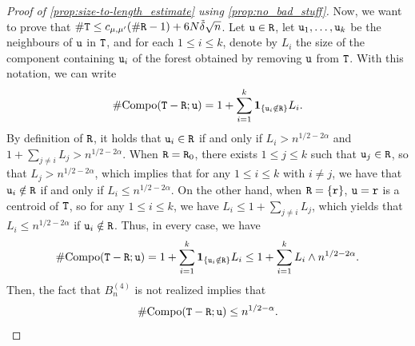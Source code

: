 \documentclass[11pt,reqno]{amsart}
\begin{document}
\begin{proof}[Proof of \cref{prop:size-to-length_estimate} using \cref{prop:no_bad_stuff}]
Now, we want to prove that $\#\mathtt{T}\leq c_{\mu,\mu'}(\#\mathtt{R}-1)+6N\tilde{\delta}\sqrt{n}$. Let $\mathtt{u}\in\mathtt{R}$, let $\mathtt{u}_1,\ldots,\mathtt{u}_k$ be the neighbours of $\mathtt{u}$ in $\mathtt{T}$, and for each $1\leq i\leq k$, denote by $L_i$ the size of the component containing $\mathtt{u}_i$ of the forest obtained by removing $\mathtt{u}$ from $\mathtt{T}$.
With this notation, we can write
\[\#\mathrm{Compo}(\mathtt{T}-\mathtt{R};\mathtt{u})=1+\sum_{i=1}^k {\mathbf 1}_{\left\{\mathtt{u}_i\notin\mathtt{R}\right\}} L_i.\]
By definition of $\mathtt{R}$, it holds that $\mathtt{u}_i\in\mathtt{R}$ if and only if $L_i>n^{1/2-2\alpha}$ and $1+\sum_{j\neq i}L_j>n^{1/2-2\alpha}$. When $\mathtt{R}=\mathtt{R}_0$, there exists $1\leq j\leq k$ such that $\mathtt{u}_j\in\mathtt{R}$, so that $L_j>n^{1/2-2\alpha}$, which implies that for any $1\leq i\leq k$ with $i\neq j$, we have that $\mathtt{u}_i\notin\mathtt{R}$ if and only if $L_i\leq n^{1/2-2\alpha}$. 
On the other hand, when $\mathtt{R}=\{\mathtt{r}\}$, $\mathtt{u}=\mathtt{r}$ is a centroid of $\mathtt{T}$, so for any $1\leq i\leq k$, we have $L_i\leq 1+\sum_{j\neq i}L_j$, which yields that $L_i\leq n^{1/2-2\alpha}$ if $\mathtt{u}_i\notin\mathtt{R}$. 
Thus, in every case, we have
\[\#\mathrm{Compo}(\mathtt{T}-\mathtt{R};\mathtt{u})=1+\sum_{i=1}^k {\mathbf 1}_{\left\{\mathtt{u}_i\notin\mathtt{R}\right\}} L_i\leq 1+\sum_{i=1}^k L_i\wedge n^{1/2-2\alpha}.\]
Then, the fact that $B_n^{(4)}$ is not realized implies that \[\#\mathrm{Compo}(\mathtt{T}-\mathtt{R};\mathtt{u})\leq n^{1/2-\alpha}.\]


\end{proof}
\end{document}
